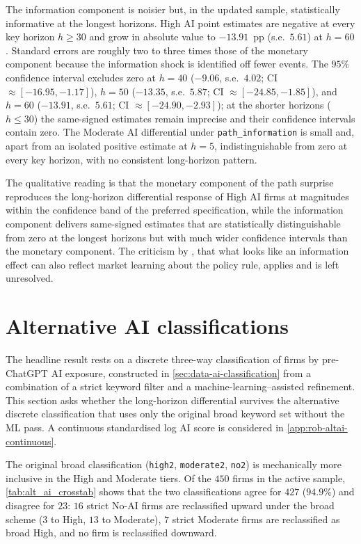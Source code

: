 The information component is noisier but, in the updated sample,
statistically informative at the longest horizons. High AI point
estimates are negative at every key horizon $h \geq 30$ and grow in
absolute value to $-13.91$~pp (s.e.~$5.61$) at $h = 60$. Standard
errors are roughly two to three times those of the monetary
component because the information shock is identified off fewer
events. The $95\%$ confidence interval excludes zero at $h = 40$
($-9.06$, s.e.~$4.02$; CI $\approx [-16.95, -1.17]$), $h = 50$
($-13.35$, s.e.~$5.87$; CI $\approx [-24.85, -1.85]$), and $h = 60$
($-13.91$, s.e.~$5.61$; CI $\approx [-24.90, -2.93]$); at the
shorter horizons ($h \leq 30$) the same-signed estimates remain
imprecise and their confidence intervals contain zero.
The Moderate AI differential under \texttt{path\_information} is
small and, apart from an isolated positive estimate at $h = 5$,
indistinguishable from zero at every key horizon, with no
consistent long-horizon pattern.

The qualitative reading is that the monetary component of the path
surprise reproduces the long-horizon differential response of High AI
firms at magnitudes within the confidence band of the preferred
specification, while the information component delivers
same-signed estimates that are statistically distinguishable from
zero at the longest horizons but with much wider confidence
intervals than the monetary component. The criticism by \citet{bauerSwanson2023}, that what looks
like an information effect can also reflect market learning about the
policy rule, applies and is left unresolved.

\section{Alternative AI classifications}
\label{sec:rob-altai}

The headline result rests on a discrete three-way classification of
firms by pre-ChatGPT AI exposure, constructed in
\cref{sec:data-ai-classification} from a combination of a strict
keyword filter and a machine-learning--assisted refinement. This
section asks whether the long-horizon differential survives the
alternative discrete classification that uses only the original broad
keyword set without the ML pass. A continuous standardised log AI
score is considered in \cref{app:rob-altai-continuous}.

The original broad classification (\texttt{high2}, \texttt{moderate2},
\texttt{no2}) is mechanically more inclusive in the High and Moderate
tiers. Of the $450$ firms in the active sample,
\cref{tab:alt_ai_crosstab} shows that the two classifications agree
for $427$ ($94.9\%$) and disagree for $23$: $16$ strict No-AI firms
are reclassified upward under the broad scheme ($3$ to High, $13$ to
Moderate), $7$ strict Moderate firms are reclassified as broad High,
and no firm is reclassified downward.

